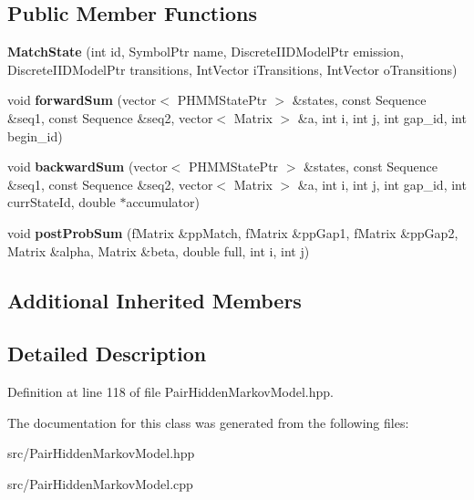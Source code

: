\subsection*{Public Member Functions}
\begin{DoxyCompactItemize}
\item 
\mbox{\label{classtops_1_1MatchState_a354e76018b7a8fd980c3bb6f9c3a503b}} 
{\bfseries Match\+State} (int id, Symbol\+Ptr name, Discrete\+I\+I\+D\+Model\+Ptr emission, Discrete\+I\+I\+D\+Model\+Ptr transitions, Int\+Vector i\+Transitions, Int\+Vector o\+Transitions)
\item 
\mbox{\label{classtops_1_1MatchState_a25f7824b2a3a3382e971f85a9a49afd7}} 
void {\bfseries forward\+Sum} (vector$<$ P\+H\+M\+M\+State\+Ptr $>$ \&states, const Sequence \&seq1, const Sequence \&seq2, vector$<$ Matrix $>$ \&a, int i, int j, int gap\+\_\+id, int begin\+\_\+id)
\item 
\mbox{\label{classtops_1_1MatchState_a9d8a8827198fae7be7d19775805792d6}} 
void {\bfseries backward\+Sum} (vector$<$ P\+H\+M\+M\+State\+Ptr $>$ \&states, const Sequence \&seq1, const Sequence \&seq2, vector$<$ Matrix $>$ \&a, int i, int j, int gap\+\_\+id, int curr\+State\+Id, double $\ast$accumulator)
\item 
\mbox{\label{classtops_1_1MatchState_a8e39a0ae9b351d68bbb92e31d83ce860}} 
void {\bfseries post\+Prob\+Sum} (f\+Matrix \&pp\+Match, f\+Matrix \&pp\+Gap1, f\+Matrix \&pp\+Gap2, Matrix \&alpha, Matrix \&beta, double full, int i, int j)
\end{DoxyCompactItemize}
\subsection*{Additional Inherited Members}


\subsection{Detailed Description}


Definition at line 118 of file Pair\+Hidden\+Markov\+Model.\+hpp.



The documentation for this class was generated from the following files\+:\begin{DoxyCompactItemize}
\item 
src/Pair\+Hidden\+Markov\+Model.\+hpp\item 
src/Pair\+Hidden\+Markov\+Model.\+cpp\end{DoxyCompactItemize}
